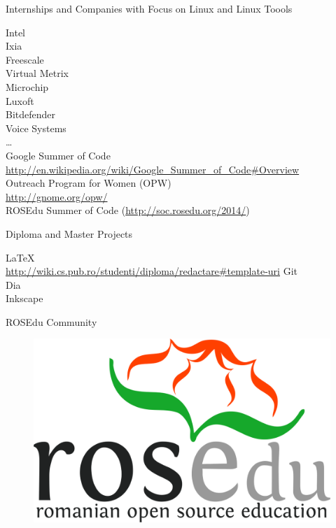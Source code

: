\documentclass{paper}
\begin{document}
\begin{frame}{Internships and Companies with Focus on Linux and Linux Toools}
  \begin{center}
    {\small
      \pause Intel \\
      \pause Ixia \\
      \pause Freescale \\
      \pause Virtual Metrix \\
      \pause Microchip \\
      \pause Luxoft \\
      \pause Bitdefender \\
      \pause Voice Systems \\
      \pause \ldots \\
      \vspace{0.3cm}
      \pause Google Summer of Code \\
      \url{http://en.wikipedia.org/wiki/Google\_Summer\_of\_Code\#Overview} \\
      \vspace{0.3cm}
      \pause Outreach Program for Women (OPW) \\
      \url{http://gnome.org/opw/} \\
      \vspace{0.3cm}
      \pause ROSEdu Summer of Code (\url{http://soc.rosedu.org/2014/})
    }
  \end{center}
\end{frame}

\begin{frame}{Diploma and Master Projects}
  \begin{center}
    {\small
      \pause \LaTeX \\
      \url{http://wiki.cs.pub.ro/studenti/diploma/redactare\#template-uri}
      \vspace{0.3cm}
      \pause Git \\
      \vspace{0.3cm}
      \pause Dia \\
      \vspace{0.3cm}
      \pause Inkscape
    }
  \end{center}
\end{frame}

\begin{frame}{ROSEdu Community}
  \begin{figure}
    \centering
      \includegraphics[width=0.6\linewidth]{img/rosedu-logo} \\
  \end{figure}
\end{frame}
\end{document}
